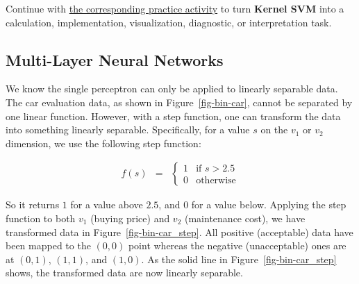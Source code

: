 \documentclass[
  letterpaper,
]{scrbook}
\begin{document}
\begin{tcolorbox}[enhanced jigsaw, arc=.35mm, bottomrule=.15mm, bottomtitle=1mm, breakable, colback=white, colbacktitle=quarto-callout-tip-color!10!white, colframe=quarto-callout-tip-color-frame, coltitle=black, left=2mm, leftrule=.75mm, opacityback=0, opacitybacktitle=0.6, rightrule=.15mm, title=\textcolor{quarto-callout-tip-color}{\faLightbulb}\hspace{0.5em}{Put it into practice}, titlerule=0mm, toprule=.15mm, toptitle=1mm]

Continue with \hyperref[sec-pr-07-kernel-svm]{the corresponding practice
activity} to turn \textbf{Kernel SVM} into a calculation,
implementation, visualization, diagnostic, or interpretation task.

\end{tcolorbox}

\subsection{Multi-Layer Neural
Networks}\label{multi-layer-neural-networks}

We know the single perceptron can only be applied to linearly separable
data. The car evaluation data, as shown in Figure~\ref{fig-bin-car},
cannot be separated by one linear function. However, with a step
function, one can transform the data into something linearly separable.
Specifically, for a value \(s\) on the \(v_1\) or \(v_2\) dimension, we
use the following step function:

\[\begin{aligned}
  f(s) & = &
  \begin{cases}
  1 & \text{if } s>2.5\\
  0 & \text{otherwise}
  \end{cases}
\end{aligned}\]

So it returns \(1\) for a value above \(2.5\), and \(0\) for a value
below. Applying the step function to both \(v_1\) (buying price) and
\(v_2\) (maintenance cost), we have transformed data in
Figure~\ref{fig-bin-car_step}. All positive (acceptable) data have been
mapped to the \((0,0)\) point whereas the negative (unacceptable) ones
are at \((0,1)\), \((1,1)\), and \((1,0)\). As the solid line in
Figure~\ref{fig-bin-car_step} shows, the transformed data are now
linearly separable.
\end{document}
